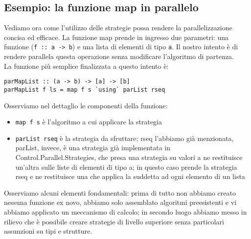 \subsection{Esempio: la funzione map in parallelo}
Vediamo ora come l'utilizzo delle strategie possa rendere la parallelizzazione concisa ed efficace. La funzione map prende in ingresso due parametri: una funzione (\texttt{f :: a -> b}) e una lista di elementi di tipo \texttt{a}. Il nostro intento è di rendere parallela questa operazione senza modificare l'algoritmo di partenza.\\
La funzione più semplice finalizzata a questo intento è:
\begin{verbatim}
parMapList :: (a -> b) -> [a] -> [b]
parMapList f ls = map f s `using` parList rseq
\end{verbatim}
Osserviamo nel dettaglio le componenti della funzione:
\begin{itemize}
\item{\texttt{map f s} è l'algoritmo a cui applicare la strategia}
\item{\texttt{parList rseq} è la strategia da sfruttare; rseq l'abbiamo già menzionata, parList, invece, è una strategia già implementata in Control.Parallel.Strategies, che presa una strategia su valori a ne restituisce un'altra sulle liste di elementi di tipo a; in questo caso prende la strategia rseq e ne restituisce una che applica la suddetta ad ogni elemento di un lista}
\end{itemize}
Osserviamo alcuni elementi fondamentali: prima di tutto non abbiamo creato nessuna funzione ex novo, abbiamo solo assemblato algoritmi preesistenti e vi abbiamo applicato un meccanismo di calcolo; in secondo luogo abbiamo messo in rilievo che è possibile creare strategie di livello superiore senza particolari assunzioni su tipi e strutture. 
